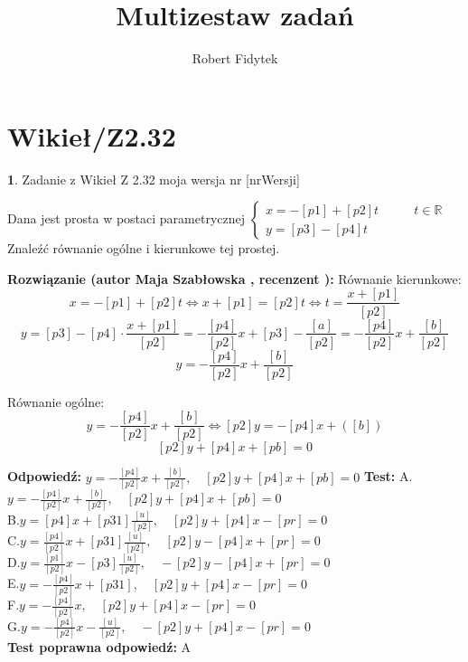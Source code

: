 \documentclass[12pt, a4paper]{article}
\title{Multizestaw zadań}
\author{Robert Fidytek}
\date{}
\theoremstyle{definition} %
\newtheorem{zad}{}
\newcommand{\kategoria}[1]{\section{#1}} %
\newcommand{\zadStart}[1]{\begin{zad}#1\newline} %
\newcommand{\zadStop}{\end{zad}}   %
\newcommand{\rozwStart}[2]{\noindent \textbf{Rozwiązanie (autor #1 , recenzent #2): }\newline} %
\newcommand{\rozwStop}{\newline}                                            %
\newcommand{\odpStart}{\noindent \textbf{Odpowiedź:}\newline}    %
\newcommand{\odpStop}{\newline}                                             %
\newcommand{\testStart}{\noindent \textbf{Test:}\newline} %
\newcommand{\testStop}{\newline} %
\newcommand{\kluczStart}{\noindent \textbf{Test poprawna odpowiedź:}\newline} %
\newcommand{\kluczStop}{\newline} %
\begin{document}
\maketitle


\kategoria{Wikieł/Z2.32}
\zadStart{Zadanie z Wikieł Z 2.32 moja wersja nr [nrWersji]}

Dana jest prosta w postaci parametrycznej $\left\{ \begin{array}{ll}
x=-[p1]+[p2]t & \quad \quad t\in\mathbb{R}\\
y=[p3]-[p4]t
\end{array} \right.$ Znaleźć równanie ogólne i kierunkowe tej prostej.

\zadStop

\rozwStart{Maja Szabłowska}{}
Równanie kierunkowe:
$$x=-[p1]+[p2]t \iff x+[p1]=[p2]t \iff t=\frac{x+[p1]}{[p2]}$$
$$y=[p3]-[p4]\cdot \frac{x+[p1]}{[p2]}=-\frac{[p4]}{[p2]}x+[p3]-\frac{[a]}{[p2]}=-\frac{[p4]}{[p2]}x+\frac{[b]}{[p2]}$$
$$y=-\frac{[p4]}{[p2]}x+\frac{[b]}{[p2]}$$

Równanie ogólne:
$$y=-\frac{[p4]}{[p2]}x+\frac{[b]}{[p2]} \iff [p2]y=-[p4]x+([b])$$
$$[p2]y+[p4]x+[pb]=0$$
\rozwStop


\odpStart
$y=-\frac{[p4]}{[p2]}x+\frac{[b]}{[p2]}, \quad [p2]y+[p4]x+[pb]=0$
\odpStop
\testStart
A.$y=-\frac{[p4]}{[p2]}x+\frac{[b]}{[p2]}, \quad [p2]y+[p4]x+[pb]=0$\\
B.$y=[p4]x+[p31]\frac{[u]}{[p2]}, \quad [p2]y+[p4]x-[pr]=0$\\
C.$y=\frac{[p4]}{[p2]}x+[p31]\frac{[u]}{[p2]}, \quad [p2]y-[p4]x+[pr]=0$\\
D.$y=\frac{[p1]}{[p2]}x-[p3]\frac{[u]}{[p2]}, \quad -[p2]y-[p4]x+[pr]=0$\\
E.$y=-\frac{[p4]}{[p2]}x+[p31], \quad [p2]y+[p4]x-[pr]=0$\\
F.$y=-\frac{[p4]}{[p2]}x, \quad [p2]y+[p4]x-[pr]=0$\\
G.$y=-\frac{[p4]}{[p2]}x-\frac{[u]}{[p2]}, \quad -[p2]y+[p4]x-[pr]=0$\\
\testStop
\kluczStart
A
\kluczStop
\end{document}
